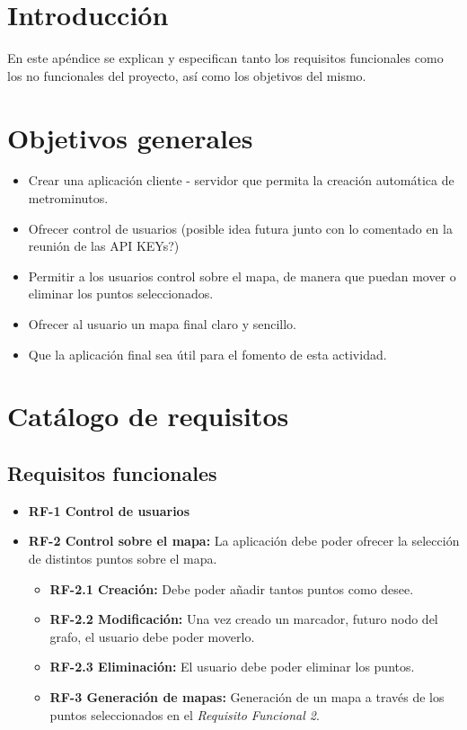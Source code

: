 
\section{Introducción}
En este apéndice se explican y especifican tanto los requisitos funcionales como los no funcionales del proyecto, así como los objetivos del mismo.

\section{Objetivos generales}

\begin{itemize}
	\item Crear una aplicación cliente - servidor que permita la creación automática de metrominutos.
    \item Ofrecer control de usuarios (posible idea futura junto con lo comentado en la reunión de las API KEYs?)
    \item Permitir a los usuarios control sobre el mapa, de manera que puedan mover o eliminar los puntos seleccionados.
    \item Ofrecer al usuario un mapa final claro y sencillo.
    \item Que la aplicación final sea útil para el fomento de esta actividad.
\end{itemize}

\section{Catálogo de requisitos}

\subsection{Requisitos funcionales}
\begin{itemize}
	\item \textbf{RF-1 Control de usuarios}
	\item \textbf{RF-2 Control sobre el mapa:} La aplicación debe poder ofrecer la selección de distintos puntos sobre el mapa.
	\begin{itemize}
		\item \textbf{RF-2.1 Creación:} Debe poder añadir tantos puntos como desee.
		\item \textbf{RF-2.2 Modificación:} Una vez creado un marcador, futuro nodo del grafo, el usuario debe poder moverlo.
		\item \textbf{RF-2.3 Eliminación:} El usuario debe poder eliminar los puntos.
		\item \textbf{RF-3 Generación de mapas:} Generación de un mapa a través de los puntos seleccionados en el \textit{Requisito Funcional 2}.
	\end{itemize}
\end{itemize}


